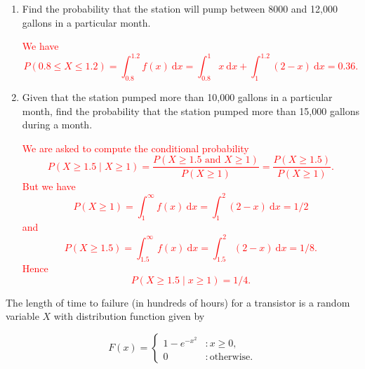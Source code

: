 \documentclass[12pt,reqno]{amsart}
\begin{document}
\medskip
\begin{enumerate}
\item Find the probability that the station will pump between 8000 and 12,000 gallons in a particular month.
    
\bigskip
\textcolor{red}{We have
    	\[
	P(0.8 \leq X \leq 1.2) = \int_{0.8}^{1.2}f(x) \ \text{d} x = \int_{0.8}^1 x \ \text{d} x + \int_1^{1.2}(2-x) \ \text{d} x = 0.36.
	\]}
\bigskip

\item Given that the station pumped more than 10,000 gallons in a particular month, find the probability that the station pumped more than 15,000 gallons during a month.
    
\bigskip
\textcolor{red}{We are asked to compute the conditional probability
    	\[
	P(X\geq 1.5 \mid X\geq 1) = \frac{P(X\geq 1.5 \text{ and } X\geq 1)}{P(X\geq 1)} = \frac{P(X\geq 1.5)}{P(X\geq 1)}.
	\]
    But we have
    	\[
	P(X\geq 1) = \int_1^\infty f(x) \ \text{d}x = \int_1^2(2-x) \ \text{d} x = 1/2
	\]
    and
    	\[
	P(X\geq 1.5) = \int_{1.5}^\infty f(x) \ \text{d} x = \int_{1.5}^2 (2-x) \ \text{d} x = 1/8.
	\]
    Hence
    	\[
	P(X\geq 1.5 \mid x\geq 1) = 1/4.
	\]}
\end{enumerate}









\bigskip
\prob The length of time to failure (in hundreds of hours) for a transistor is a random variable $X$ with
distribution function given by

	\[
	F(x) = \begin{cases}
        1 - e^{-x^2} & : x\geq 0, \\
        0 & : \text{otherwise}.
	\end{cases}
	\]
\end{document}
